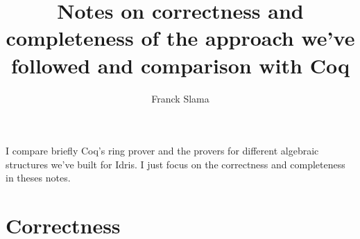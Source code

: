 \documentclass{llncs}
\begin{document}
%
\frontmatter          %
%
\pagestyle{headings}  %
%

\mainmatter              %
%
\title{Notes on correctness and completeness of the approach we've followed and comparison with Coq} 
%
%
\author{Franck Slama}
%
%
%

\maketitle              %

\abstract
I compare briefly Coq's ring prover and the provers for different algebraic structures we've built for Idris. I just focus on the correctness and completeness in theses notes.

\section{Correctness}
\end{document}
